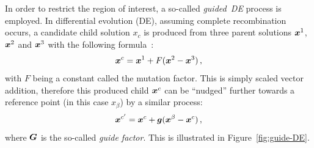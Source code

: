 In order to restrict the region of interest, a so-called \emph{guided~DE} process is employed. In differential evolution (DE), assuming complete recombination occurs, a candidate child solution $x_c$ is produced from three parent solutions $\boldsymbol{x}^1$, $\boldsymbol{x}^2$ and $\boldsymbol{x}^3$ with the following formula~\cite{storn1997differential}:
\begin{equation}
\boldsymbol{x}^c = \boldsymbol{x}^1 + F(\boldsymbol{x}^2 - \boldsymbol{x}^3)\,,
\end{equation}
with $F$ being a constant called the mutation factor. This is simply scaled vector addition, therefore this produced child $\boldsymbol{x}^c$ can be ``nudged'' further towards a reference point (in this case $x_\beta$) by a similar process:
\begin{equation}\label{eq:nudge}
\boldsymbol{x}^{c'} = \boldsymbol{x}^c + \boldsymbol{g}(\boldsymbol{x}^\beta - \boldsymbol{x}^c)\,,
\end{equation}
where $\boldsymbol{G}$ is the so-called \emph{guide factor}. This is illustrated in Figure~\ref{fig:guide-DE}.

